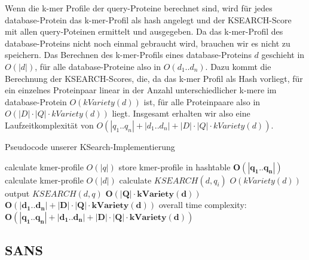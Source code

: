 \documentclass{article}
\begin{document}
Wenn die k-mer Profile der query-Proteine berechnet sind, wird für jedes database-Protein das k-mer-Profil als hash angelegt und der KSEARCH-Score mit allen query-Poteinen ermittelt und ausgegeben. Da das k-mer-Profil des database-Proteins nicht noch einmal gebraucht wird, brauchen wir es nicht zu speichern. Das Berechnen des k-mer-Profils eines database-Proteins $d$ geschieht in $O(|d|)$, für alle database-Proteine also in $O(d_1..d_n)$. Dazu kommt die Berechnung der KSEARCH-Scores, die, da das k-mer Profil als Hash vorliegt, für ein einzelnes Proteinpaar linear in der Anzahl unterschiedlicher k-mere im database-Protein $O(kVariety(d))$ ist, für alle Proteinpaare also in $O(|D| \cdot |Q| \cdot kVariety(d))$ liegt. Insgesamt erhalten wir also eine Laufzeitkomplexität von $O(|q_1..q_n|+|d_1..d_n|+|D| \cdot |Q| \cdot kVariety(d))$.



\begin{algorithm}
  \caption{Pseudocode unserer KSearch-Implementierung}
\begin{algorithmic}
      \State calculate kmer-profile \Comment $O(|q|)$
      \State store kmer-profile in hashtable
    \EndFor \Comment $\mathbf{O(|q_1..q_n|)}$
      \State calculate kmer-profile \Comment $O(|d|)$
        \State calculate $KSEARCH(d,q_{i})$ \Comment $O(kVariety(d))$   
        \State output $KSEARCH(d,q)$
      \EndFor \Comment $\mathbf{O(|Q| \cdot kVariety(d))}$
    \EndFor   \Comment $\mathbf{O(|d_1..d_n|+|D| \cdot |Q| \cdot kVariety(d))}$  
  \EndFunction \Comment overall time complexity: $\mathbf{O(|q_1..q_n|+|d_1..d_n|+|D| \cdot |Q| \cdot kVariety(d))}$
\end{algorithmic}
\end{algorithm}

\subsection{SANS}
\label{sans}
\end{document}
